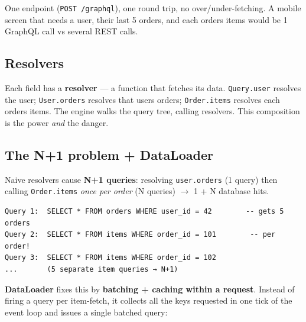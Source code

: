 \documentclass[11pt]{article}
\begin{document}
One endpoint (\texttt{POST\ /graphql}), one round trip, no over/under-fetching. A mobile screen that needs a user, their last 5 orders, and each order\textquotesingle s items would be 1 GraphQL call vs several REST calls.

\subsection{Resolvers}\label{resolvers}

Each field has a \textbf{resolver} --- a function that fetches its data. \texttt{Query.user} resolves the user; \texttt{User.orders} resolves that user\textquotesingle s orders; \texttt{Order.items} resolves each order\textquotesingle s items. The engine walks the query tree, calling resolvers. This composition is the power \emph{and} the danger.

\subsection{The N+1 problem + DataLoader}\label{the-n1-problem--dataloader}

Naive resolvers cause \textbf{N+1 queries}: resolving \texttt{user.orders} (1 query) then calling \texttt{Order.items} \emph{once per order} (N queries) \(\rightarrow\) 1 + N database hits.

\setcodelang{}

\begin{verbatim}
Query 1:  SELECT * FROM orders WHERE user_id = 42        -- gets 5 orders
Query 2:  SELECT * FROM items WHERE order_id = 101        -- per order!
Query 3:  SELECT * FROM items WHERE order_id = 102
...       (5 separate item queries → N+1)
\end{verbatim}

\textbf{DataLoader} fixes this by \textbf{batching + caching within a request}. Instead of firing a query per item-fetch, it collects all the keys requested in one tick of the event loop and issues a single batched query:

\end{document}
